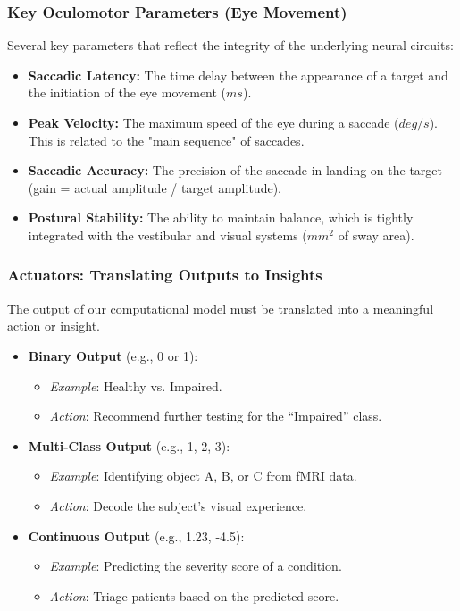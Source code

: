 \documentclass[handout]{beamer}
\begin{document}
\begin{frame}
	\frametitle{Key Oculomotor Parameters (Eye Movement)}
	Several key parameters that reflect the integrity of the underlying neural circuits:
	\begin{itemize}
		\item \textbf{Saccadic Latency:} The time delay between the appearance of a target and the initiation of the eye movement ($ms$).
		\item \textbf{Peak Velocity:} The maximum speed of the eye during a saccade ($deg/s$). This is related to the "main sequence" of saccades.
		\item \textbf{Saccadic Accuracy:} The precision of the saccade in landing on the target (gain = actual amplitude / target amplitude).
		\item \textbf{Postural Stability:} The ability to maintain balance, which is tightly integrated with the vestibular and visual systems ($mm^2$ of sway area).
	\end{itemize}
\end{frame}
	
\begin{frame}
	\frametitle{Actuators: Translating Outputs to Insights}
	The output of our computational model must be translated into a meaningful action or insight.
	\begin{itemize}
		\item \textbf{Binary Output} (e.g., 0 or 1):
		\begin{itemize}
			\item \textit{Example}: Healthy vs. Impaired.
			\item \textit{Action}: Recommend further testing for the ``Impaired'' class.
		\end{itemize}
		\item \textbf{Multi-Class Output} (e.g., 1, 2, 3):
		\begin{itemize}
			\item \textit{Example}: Identifying object A, B, or C from fMRI data.
			\item \textit{Action}: Decode the subject's visual experience.
		\end{itemize}
		\item \textbf{Continuous Output} (e.g., 1.23, -4.5):
		\begin{itemize}
			\item \textit{Example}: Predicting the severity score of a condition.
			\item \textit{Action}: Triage patients based on the predicted score.
		\end{itemize}
	\end{itemize}
\end{frame}
\end{document}
